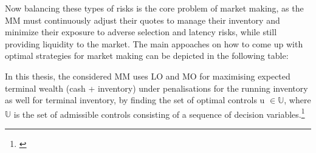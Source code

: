 \documentclass[12pt,a4paper]{cau_thesis}
\begin{document}
Now balancing these types of risks is the core problem of market
making, as the MM must continuously adjust their quotes to manage
their inventory and minimize their exposure to adverse selection and
latency risks, while still providing liquidity to the market. The
main appoaches on how to come up with optimal strategies for market
making can be depicted in the following table:

In this thesis, the considered MM uses LO and MO for maximising
expected terminal wealth (cash + inventory) under penalisations for
the running inventory as well for terminal inventory, by finding the
set of optimal controls u $\in \mathbb{U}$, where $\mathbb{U}$ is the
set of admissible controls consisting of a sequence of decision
variables.\footnote{\cite[See ][, p.]{luckner2021hawkes}}

\end{document}
